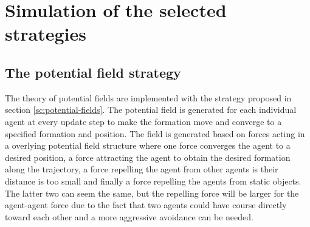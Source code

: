 \section{Simulation of the selected strategies}
\label{sc:simofstrat}
\subsection{The potential field strategy}
The theory of potential fields are implemented with the strategy proposed in section \ref{sc:potential-fields}. The potential field is generated for each individual agent at every update step to make the formation move and converge to a specified formation and position. The field is generated based on forces acting in a overlying potential field structure where one force converges the agent to a desired position, a force attracting the agent to obtain the desired formation along the trajectory, a force repelling the agent from other agents is their distance is too small and finally a force repelling the agents from static objects. The latter two can seem the same, but the repelling force will be larger for the agent-agent force due to the fact that two agents could have course directly toward each other and a more aggressive avoidance can be needed.


